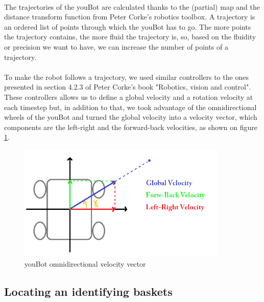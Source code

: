 \documentclass[12pt,a4paper]{article}
\begin{document}
\paragraph{}
The trajectories of the youBot are calculated thanks to the (partial) map and the distance transform function from Peter Corke's robotics toolbox\cite{CorkeRTB}. A trajectory is an ordered list of points through which the youBot has to go. The more points the trajectory contains, the more fluid the trajectory is, so, based on the fluidity or precision we want to have, we can increase the number of points of a trajectory. 

\paragraph{}
To make the robot follows a trajectory, we used similar controllers to the ones presented in section 4.2.3 of Peter Corke's book "Robotics, vision and control"\cite{CorkeBook}. These controllers allows us to define a global velocity and a rotation velocity at each timestep but, in addition to that, we took advantage of the omnidirectional wheels of the youBot and turned the global velocity into a velocity vector, which components are the left-right and the forward-back velocities, as shown on figure \ref{velocities}.

\begin{figure}[h]
	\centering
		\includegraphics[width=10cm]{velocities.png}
	\caption{youBot omnidirectional velocity vector}
	\label{velocities}
\end{figure}

\FloatBarrier

\subsection{Locating an identifying baskets}

\paragraph{}
\end{document}
